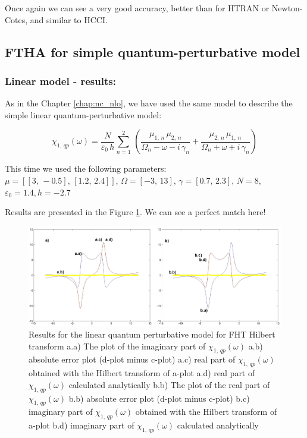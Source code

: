 \documentclass[12pt,twoside,a4paper]{article}
\numberwithin{equation}{subsection}
\numberwithin{figure}{subsection}
\begin{document}
Once again we can see a very good accuracy, better than for HTRAN or Newton-Cotes, and similar to HCCI.

\subsection{FTHA for simple quantum-perturbative model} \label{chap:hartley_quantum}

\subsubsection*{Linear model - results:}

As in the Chapter \ref{chap:nc_nlo}, we have used the same model to describe the simple linear quantum-perturbative model: 

\begin{equation} \label{eq:fht_qp}
  {\chi_{1, \,qp}}(\omega ) = \frac {N}{\varepsilon_0\,h} \sum_{n=1}^{2}\,(\frac {{\mu_{1, \,n}}\,{ \mu_{2, \,n}}}{{\Omega_{n}}
  - \omega  - i\,{\gamma_{n}}} + \frac {{\mu_{2, \,n}}\,{\mu_{1, \,n}}}{{\Omega_{n}} + \omega + i\,{\gamma_{n}}})
\end{equation}

This time we used the following parameters: \\
$\mu = [[3, \, - 0.5], \,[1.2, \,2.4]]$, 
$\Omega =[ - 3, \,13]$, 
$\gamma =[0.7, \,2.3]$,  
$N=8$, 
${\varepsilon_{0}}=1.4, 
h= - 2.7$

Results are presented in the Figure \ref{fig:fht_qp1}. We can see a perfect match here!

\begin{figure}
  \includegraphics[width=150mm]{img/fht_qp1.png}
  \caption{Results for the linear quantum perturbative model for FHT Hilbert transform
    a.a) The plot of the imaginary part of ${\chi_{1, \,qp}}(\omega )$
    a.b) absolute error plot (d-plot minus c-plot) 
    a.c) real part of $\chi_{1, \, qp} (\omega )$ obtained with the Hilbert transform of a-plot 
    a.d) real part of $\chi_{1, \, qp} (\omega )$ calculated analytically 
    b.b) The plot of the real part of $ \chi_{1, \, qp} (\omega )$ 
    b.b) absolute error plot (d-plot minus c-plot) 
    b.c) imaginary part of $\chi_{1, \, qp} (\omega )$ obtained with the Hilbert transform of a-plot 
    b.d) imaginary part of $\chi_{1, \, qp} (\omega )$ calculated analytically  
    \label{fig:fht_qp1}
  }
\end{figure}
\end{document}
